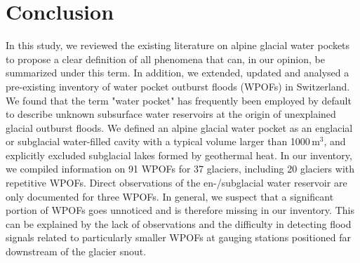 \section{ Conclusion}

In this study, we reviewed the existing literature on alpine glacial water pockets to propose a clear definition of all phenomena that can, in our opinion, be summarized under this term. In addition, we extended, updated and analysed a pre-existing inventory of water pocket outburst floods (WPOFs) in Switzerland. We found that the term "water pocket" has frequently been employed by default to describe unknown subsurface water reservoirs at the origin of unexplained glacial outburst floods. We defined an alpine glacial water pocket as an englacial or subglacial water-filled cavity with a typical volume larger than 1000\,m$^3$, and explicitly excluded subglacial lakes formed by geothermal heat. In our inventory, we compiled information on 91 WPOFs for 37 glaciers, including 20 glaciers with repetitive WPOFs. Direct observations of the en-/subglacial water reservoir are only documented for three WPOFs. In general, we suspect that a significant portion of WPOFs goes unnoticed and is therefore missing in our inventory. This can be explained by the lack of observations and the difficulty in detecting flood signals related to particularly smaller WPOFs at gauging stations positioned far downstream of the glacier snout. 


